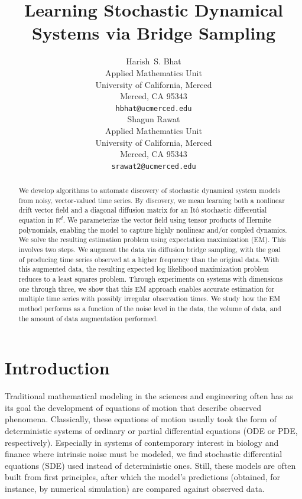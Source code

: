 \documentclass{article}
\title{Learning Stochastic Dynamical Systems via Bridge Sampling}
\author{
 Harish~S. Bhat\\
 Applied Mathematics Unit\\
 University of California, Merced\\
 Merced, CA 95343\\
 \texttt{hbhat@ucmerced.edu} \\
 \And
 Shagun Rawat\\
 Applied Mathematics Unit\\
 University of California, Merced\\
 Merced, CA 95343\\
 \texttt{srawat2@ucmerced.edu}
}
\begin{document}
\maketitle


\begin{abstract}
  We develop algorithms to automate discovery of stochastic dynamical system
  models from noisy, vector-valued time series.  By discovery, we mean 
  learning both a nonlinear drift vector field and a diagonal diffusion matrix 
  for an It\^{o} stochastic differential equation in $\mathbb{R}^d$.  We 
  parameterize the vector field using tensor products of Hermite polynomials,
  enabling the model to capture highly nonlinear and/or coupled dynamics.
  We solve the resulting estimation problem using expectation maximization (EM).
  This involves two steps.  We augment the data via diffusion bridge
  sampling, with the goal of producing time series observed at a higher
  frequency than the original data.  With this augmented data,
  the resulting expected log likelihood maximization problem
  reduces to a least squares problem.  Through experiments on systems with 
  dimensions one through three, we show that this EM approach enables 
  accurate estimation for multiple time series with possibly irregular 
  observation times.  We study how the EM method performs as a function of
  the noise level in the data, the volume of data, and the amount of data
  augmentation performed.  
\end{abstract}

\section{Introduction}
\vspace{-1.5ex}

Traditional mathematical modeling in the sciences and engineering often has as its goal the development of equations of motion that describe observed phenomena.  Classically, these equations of motion usually took the form of deterministic systems of ordinary or partial differential equations (ODE or PDE, respectively).  Especially in systems of contemporary interest in biology and finance where intrinsic noise must be modeled, we find stochastic differential equations (SDE) used instead of deterministic ones.  Still, these models are often built from first principles, after which the model's predictions (obtained, for instance, by numerical simulation) are compared against observed data.
\end{document}
